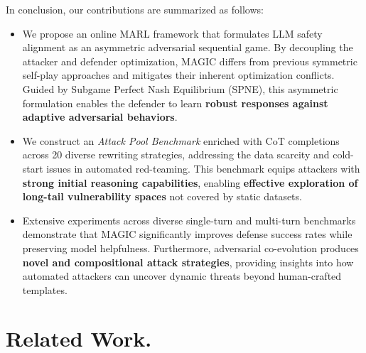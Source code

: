 \documentclass[11pt, letterpaper]{template}
\theoremstyle{plain}
\theoremstyle{definition}
\theoremstyle{remark}
\begin{document}
In conclusion, our contributions are summarized as follows:

\begin{itemize}[leftmargin=*]
    \item We propose an online MARL framework that formulates LLM safety alignment as an asymmetric adversarial sequential game. By decoupling the attacker and defender optimization, MAGIC differs from previous symmetric self-play approaches and mitigates their inherent optimization conflicts. Guided by Subgame Perfect Nash Equilibrium (SPNE), this asymmetric formulation enables the defender to learn \textbf{robust responses against adaptive adversarial behaviors}.
    
    \item We construct an \textit{Attack Pool Benchmark} enriched with CoT completions across 20 diverse rewriting strategies, addressing the data scarcity and cold-start issues in automated red-teaming. This benchmark equips attackers with \textbf{strong initial reasoning capabilities}, enabling \textbf{effective exploration of long-tail vulnerability spaces} not covered by static datasets.
    
    \item Extensive experiments across diverse single-turn and multi-turn benchmarks demonstrate that MAGIC significantly improves defense success rates while preserving model helpfulness. Furthermore, adversarial co-evolution produces \textbf{novel and compositional attack strategies}, providing insights into how automated attackers can uncover dynamic threats beyond human-crafted templates.
\end{itemize}

\section{Related Work.}
\end{document}
